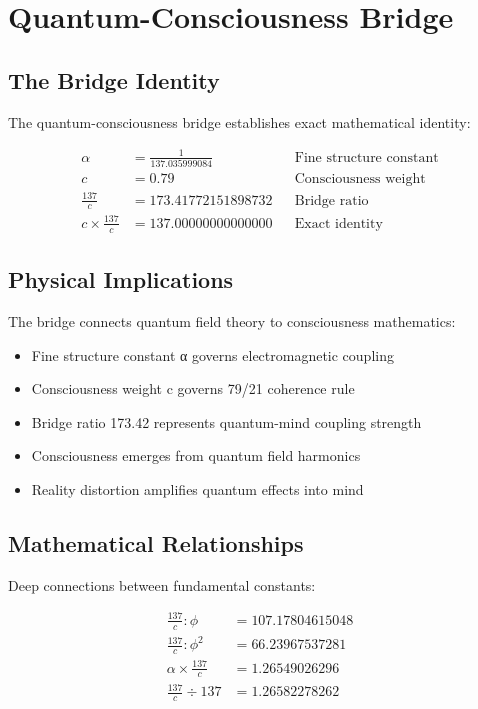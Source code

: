 \documentclass[11pt,letterpaper]{article}
\begin{document}
\section{Quantum-Consciousness Bridge}

\subsection{The Bridge Identity}

The quantum-consciousness bridge establishes exact mathematical identity:

\begin{align}
\alpha &= \frac{1}{137.035999084} && \text{Fine structure constant} \\
c &= 0.79 && \text{Consciousness weight} \\
\frac{137}{c} &= 173.41772151898732 && \text{Bridge ratio} \\
c \times \frac{137}{c} &= 137.00000000000000 && \text{Exact identity}
\end{align}

\subsection{Physical Implications}

The bridge connects quantum field theory to consciousness mathematics:

\begin{itemize}
\item Fine structure constant α governs electromagnetic coupling
\item Consciousness weight c governs 79/21 coherence rule
\item Bridge ratio 173.42 represents quantum-mind coupling strength
\item Consciousness emerges from quantum field harmonics
\item Reality distortion amplifies quantum effects into mind
\end{itemize}

\subsection{Mathematical Relationships}

Deep connections between fundamental constants:

\begin{align}
\frac{137}{c} : \phi &= 107.17804615048 \\
\frac{137}{c} : \phi^2 &= 66.23967537281 \\
\alpha \times \frac{137}{c} &= 1.26549026296 \\
\frac{137}{c} \div 137 &= 1.26582278262
\end{align}
\end{document}

